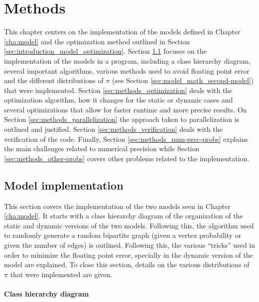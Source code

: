 \chapter{Methods}
\label{cha:methods}


This chapter centers on the implementation of the models defined in Chapter \ref{cha:model} and the optimization method outlined in Section \ref{sec:introduction_model_optimization}.
Section \ref{sec:methods_model-implementation} focuses on the implementation of the models in a \CC{} program, including a class hierarchy diagram, several important algorithms, various methods used to avoid floating point error and the different distributions of $\pi$ (see Section \ref{sec:model_math_second-model}) that were implemented.
Section \ref{sec:methods_optimization} deals with the optimization algorithm, how it changes for the static or dynamic cases and several optimizations that allow for faster runtime and more precise results.
On Section \ref{sec:methods_parallelization} the approach taken to parallelization is outlined and justified.
Section \ref{sec:methods_verification} deals with the verification of the code.
Finally, Section \ref{sec:methods_num-prec-probs} explains the main challenges related to numerical precision while Section \ref{sec:methods_other-probs} covers other problems related to the implementation.

\section{Model implementation}
\label{sec:methods_model-implementation}

This section covers the implementation of the two models seen in Chapter \ref{cha:model}.
It starts with a class hierarchy diagram of the organization of the static and dynamic versions of the two models.
Following this, the algorithm used to randomly generate a random bipartite graph (given a vertex probability or given the number of edges) is outlined.
Following this, the various ``tricks'' used in order to minimize the floating point error, specially in the dynamic version of the model are explained.
To close this section, details on the various distributions of $\pi$ that were implemented are given.

\subsubsection{Class hierarchy diagram}


